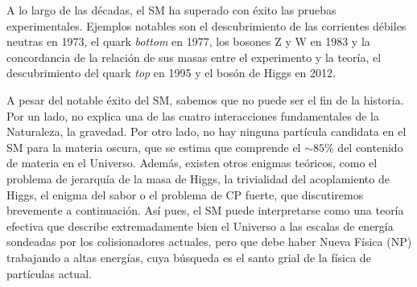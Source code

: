 A lo largo de las décadas, el SM ha superado con éxito las pruebas experimentales. Ejemplos notables son el descubrimiento de las corrientes débiles neutras en 1973, el quark \textit{bottom} en 1977, los bosones Z y W en 1983 y la concordancia de la relación de sus masas entre el experimento y la teoría, el descubrimiento del quark \textit{top} en 1995 y el bosón de Higgs en 2012. 

A pesar del notable éxito del SM, sabemos que no puede ser el fin de la historia. Por un lado, no explica una de las cuatro interacciones fundamentales de la Naturaleza, la gravedad. Por otro lado, no hay ninguna partícula candidata en el SM para la materia oscura, que se estima que comprende el $\sim85\%$ del contenido de materia en el Universo. Además, existen otros enigmas teóricos, como el problema de jerarquía de la masa de Higgs, la trivialidad del acoplamiento de Higgs, el enigma del sabor o el problema de CP fuerte, que discutiremos brevemente a continuación. Así pues, el SM puede interpretarse como una teoría efectiva que describe extremadamente bien el Universo a las escalas de energía sondeadas por los colisionadores actuales, pero que debe haber Nueva Física (NP) trabajando a altas energías, cuya búsqueda es el santo grial de la física de partículas actual. 


